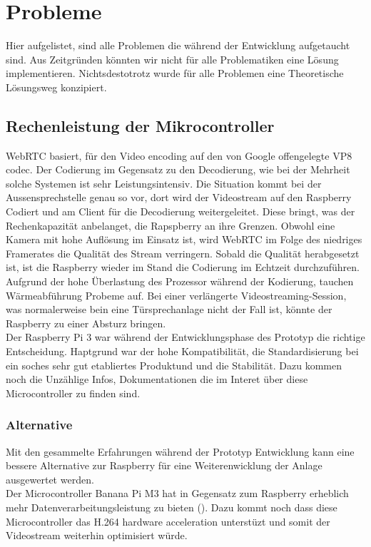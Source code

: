 \section{Probleme}
\label{sec:chapterexample}
Hier aufgelistet, sind alle Problemen die während der Entwicklung aufgetaucht sind. Aus Zeitgründen könnten wir nicht für alle Problematiken eine Lösung implementieren. Nichtsdestotrotz wurde für alle Problemen eine Theoretische Lösungsweg konzipiert. 

\subsection{Rechenleistung der Mikrocontroller}
\label{sec:microcontroller}
WebRTC basiert, für den Video encoding auf den von Google offengelegte VP8 codec. Der Codierung im Gegensatz zu den Decodierung, wie bei der Mehrheit solche Systemen ist sehr Leistungsintensiv. Die Situation kommt bei der Aussensprechstelle genau so vor, dort wird der Videostream auf den Raspberry Codiert und am Client für die Decodierung weitergeleitet. Diese bringt, was der Rechenkapazität anbelanget,  die Rapspberry  an ihre Grenzen. Obwohl eine Kamera mit hohe Auflösung im Einsatz ist, wird WebRTC im Folge des niedriges Framerates die Qualität des Stream verringern. Sobald die Qualität herabgesetzt ist, ist die Raspberry wieder im Stand die Codierung im Echtzeit durchzuführen.
\\
Aufgrund der hohe Überlastung des Prozessor während der Kodierung, tauchen Wärmeabführung Probeme auf. Bei einer verlängerte Videostreaming-Session, was normalerweise bein eine Türsprechanlage nicht der Fall ist, könnte der Raspberry zu einer Absturz bringen. 
\\
Der Raspberry Pi 3 war während der Entwicklungsphase des Prototyp die richtige Entscheidung. Haptgrund war der hohe Kompatibilität, die Standardisierung bei ein soches sehr gut etabliertes Produktund und die Stabilität. Dazu kommen noch die Unzählige Infos, Dokumentationen die im Interet über diese Microcontroller zu finden sind.

\subsubsection{Alternative}
Mit den gesammelte Erfahrungen während der Prototyp Entwicklung kann eine bessere Alternative zur Raspberry für eine Weiterenwicklung der Anlage ausgewertet werden. 
\\
Der Microcontroller Banana Pi M3 hat in Gegensatz zum Raspberry erheblich mehr Datenverarbeitungsleistung zu bieten (). Dazu kommt noch dass diese Microcontroller das H.264 hardware acceleration unterstüzt und somit der Videostream weiterhin optimisiert würde.

